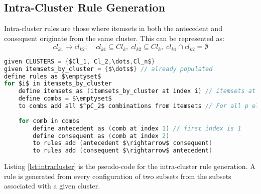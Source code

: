 \subsection{Intra-Cluster Rule Generation}
Intra-cluster rules are those where itemsets in both the antecedent and consequent originate from the same cluster. This can be represented as:
\[
cl_{k1} \rightarrow cl_{k2}; \;\;\;\; cl_{k1} \subseteq Cl_k,\; cl_{k2} \subseteq Cl_k,\; cl_{k1} \cap cl_{k2} = \emptyset
\]

\begin{lstlisting}[language=C, mathescape=true, caption=Intra-Cluster Rule Generation, label=lst:intracluster]
given CLUSTERS = {$Cl_1, Cl_2,\dots,Cl_n$}
given itemsets_by_cluster = {$\dots$} // already populated
define rules as $\emptyset$
for $i$ in itemsets_by_cluster
    define itemsets as (itemsets_by_cluster at index i) // itemsets at $i^{th}$ cluster.
    define combs = $\emptyset$
    to combs add all $^pC_2$ combinations from itemsets // For all p elements in itemsets
    
    for comb in combs
        define antecedent as (comb at index 1) // first index is 1
        define consequent as (comb at index 2)
        to rules add (antecedent $\rightarrow$ consequent)
        to rules add (consequent $\rightarrow$ antecedent) 
\end{lstlisting}
Listing \ref{lst:intracluster} is the pseudo-code for the intra-cluster rule generation. A rule is generated from every configuration of two subsets from the subsets associated with a given cluster.

